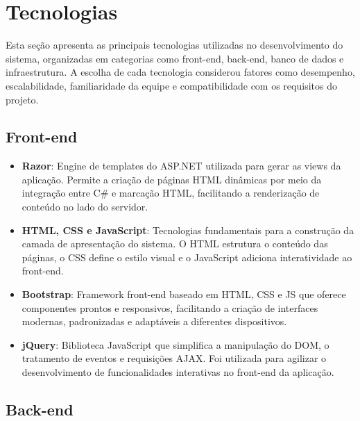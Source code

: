 \documentclass[
	12pt,				%
	openright,			%
	twoside,			%
	a4paper,			%
	english,			%
	french,				%
	spanish,			%
	brazil				%
	]{abntex2}
\begin{document}
\section{Tecnologias}

Esta seção apresenta as principais tecnologias utilizadas no desenvolvimento do sistema, organizadas em categorias como front-end, back-end, banco de dados e infraestrutura. A escolha de cada tecnologia considerou fatores como desempenho, escalabilidade, familiaridade da equipe e compatibilidade com os requisitos do projeto.

\subsection{Front-end}

\begin{itemize}

   \item \textbf{Razor}: Engine de templates do ASP.NET utilizada para gerar as views da aplicação. Permite a criação de páginas HTML dinâmicas por meio da integração entre C\# e marcação HTML, facilitando a renderização de conteúdo no lado do servidor.

   \item \textbf{HTML, CSS e JavaScript}: Tecnologias fundamentais para a construção da camada de apresentação do sistema. O HTML estrutura o conteúdo das páginas, o CSS define o estilo visual e o JavaScript adiciona interatividade ao front-end.

   \item \textbf{Bootstrap}: Framework front-end baseado em HTML, CSS e JS que oferece componentes prontos e responsivos, facilitando a criação de interfaces modernas, padronizadas e adaptáveis a diferentes dispositivos.

   \item \textbf{jQuery}: Biblioteca JavaScript que simplifica a manipulação do DOM, o tratamento de eventos e requisições AJAX. Foi utilizada para agilizar o desenvolvimento de funcionalidades interativas no front-end da aplicação.

\end{itemize}


\subsection{Back-end}
\end{document}
